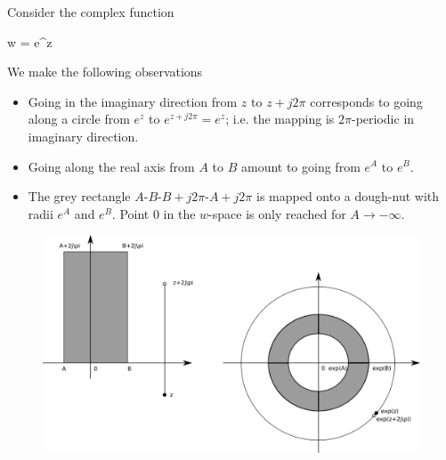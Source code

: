 

Consider the complex function

\bee
w = e^z
\eee

We make the following observations

\begin{itemize}
	
	\item Going in the imaginary direction from $z$ to $z+j2\pi$ corresponds to going along a circle from $e^z$ to $e^{z+j2\pi} = e^z$; i.e. the mapping is $2\pi$-periodic in imaginary direction.

	\item Going along the real axis from $A$ to $B$ amount to going from $e^A$ to $e^B$.

	\item The grey rectangle $A$-$B$-$B+j2\pi$-$A+j2\pi$ is mapped onto a dough-nut with radii $e^A$ and $e^B$. Point $0$ in the $w$-space is only reached for $A \rightarrow -\infty$.
	
\end{itemize}



\begin{figure}[H]
	\includegraphics[scale=0.8]{images/complex_mappings_exp.png}
\end{figure}







